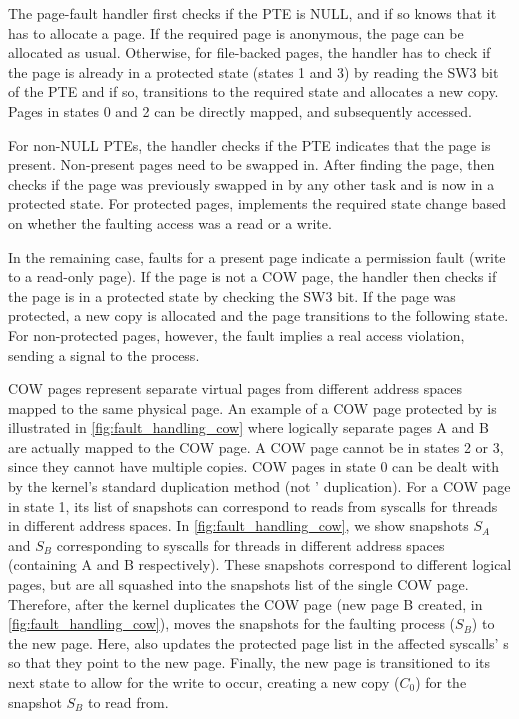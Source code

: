 \documentclass[letterpaper,twocolumn,10pt]{article}
\begin{document}
The page-fault handler first checks if the PTE is NULL, and if so 
knows that it has to allocate a page. 
If the required page is anonymous, the page can be allocated as usual.
Otherwise, for file-backed pages, the handler has to check if the 
page is already in a protected state (states 1 and 3) by reading 
the SW3 bit of the PTE and if so, transitions to the required state
and allocates a new copy. 
Pages in states 0 and 2 can be directly mapped, and subsequently
accessed.

For non-NULL PTEs, the handler checks if the PTE indicates that the 
page is present.
Non-present pages need to be swapped in.
After finding the page, \midas then checks if the page was previously 
swapped in by any other task and is now in a protected state.
For protected pages, \midas implements the required state change based 
on whether the faulting access was a read or a write.

In the remaining case, faults for a present page indicate a 
permission fault (write to a read-only page).
If the page is not a COW page, the handler then checks if the page
is in a protected state by checking the SW3 bit.
If the page was protected, a new copy is allocated and the page 
transitions to the following state.
For non-protected pages, however, the fault implies a real access
violation, sending a signal to the process.

COW pages represent separate virtual pages from different 
address spaces mapped to the same physical page.
An example of a COW page protected by \midas is illustrated in 
\autoref{fig:fault_handling_cow} where logically separate pages A and B 
are actually mapped to the COW page.
A COW page cannot be in states 2 or 3, since they cannot have multiple
\midas copies.
COW pages in state 0 can be dealt with by the kernel's standard
duplication method (not \midas' duplication).
For a COW page in state 1, its list of snapshots can correspond to 
reads from syscalls for threads in different address spaces.
In \autoref{fig:fault_handling_cow}, we show snapshots $S_A$ and 
$S_B$ corresponding to syscalls for threads in different address 
spaces (containing A and B respectively).
These snapshots correspond to different logical pages, but are 
all squashed into the snapshots list of the single COW page. 
Therefore, after the kernel duplicates the COW page (new page
B created, in \autoref{fig:fault_handling_cow}), \midas moves 
the snapshots for the faulting process ($S_B$) to the new page.
Here, \midas also updates the protected page list in the 
affected syscalls' s so that they point to the 
new page.
Finally, the new page is transitioned to its next state to allow 
for the write to occur, creating a new copy ($C_0$) for the
snapshot $S_B$ to read from.
\end{document}
